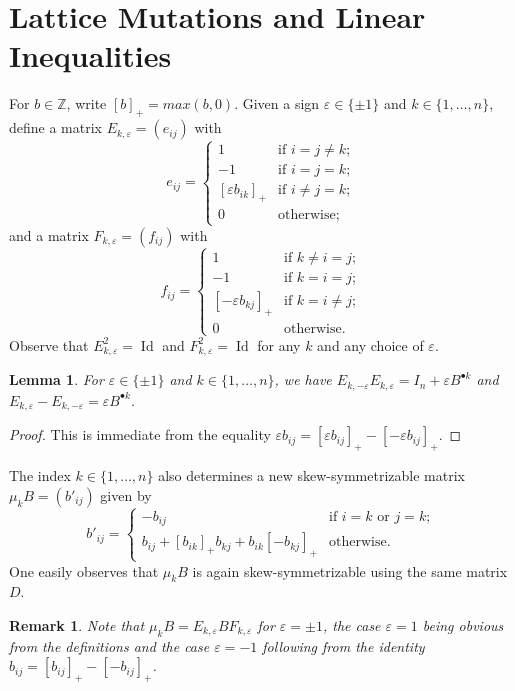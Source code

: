 \documentclass{amsart}
\newtheorem{lemma}[theorem]{Lemma}
\newtheorem{remark}[theorem]{Remark}
\numberwithin{theorem}{section}
\newcommand{\ZZ}{\mathbb{Z}}
\newcommand{\Id}{\operatorname{Id}}
\begin{document}
\section{Lattice Mutations and Linear Inequalities}


  For $b\in\ZZ$, write $[b]_+=max(b,0)$.
  Given a sign $\varepsilon\in\{\pm1\}$ and $k\in\{1,\ldots,n\}$, define a matrix $E_{k,\varepsilon}=(e_{ij})$ with
  \begin{equation}
    \label{eq:left mutation matrix}
    e_{ij}=\begin{cases} 1 & \text{if $i=j\ne k$;}\\ -1 & \text{if $i=j=k$;}\\ [\varepsilon b_{ik}]_+ & \text{if $i\ne j=k$;}\\ 0 & \text{otherwise;} \end{cases}
  \end{equation}
  and a matrix $F_{k,\varepsilon}=(f_{ij})$ with
  \begin{equation}
    \label{eq:right mutation matrix}
    f_{ij}=\begin{cases} 1 & \text{if $k\ne i=j$;}\\ -1 & \text{if $k=i=j$;}\\ [-\varepsilon b_{kj}]_+ & \text{if $k=i\ne j$;}\\ 0 & \text{otherwise.} \end{cases}
  \end{equation}
  Observe that $E^2_{k,\varepsilon}=\Id$ and $F^2_{k,\varepsilon}=\Id$ for any $k$ and any choice of $\varepsilon$.
  \begin{lemma}
    For $\varepsilon\in\{\pm1\}$ and $k\in\{1,\ldots,n\}$, we have $E_{k,-\varepsilon}E_{k,\varepsilon}=I_n+\varepsilon B^{\bullet k}$ and $E_{k,\varepsilon}-E_{k,-\varepsilon}=\varepsilon B^{\bullet k}$.
  \end{lemma}
  \begin{proof}
    This is immediate from the equality $\varepsilon b_{ij}=[\varepsilon b_{ij}]_+-[-\varepsilon b_{ij}]_+$.
  \end{proof}

  The index $k\in\{1,\ldots,n\}$ also determines a new skew-symmetrizable matrix $\mu_k B=(b'_{ij})$ given by
  \[ b'_{ij}=\begin{cases} -b_{ij} & \text{if $i=k$ or $j=k$;}\\ b_{ij}+[b_{ik}]_+b_{kj}+b_{ik}[-b_{kj}]_+ & \text{otherwise.} \end{cases} \]
  One easily observes that $\mu_k B$ is again skew-symmetrizable using the same matrix $D$.
  \begin{remark}
    Note that $\mu_k B=E_{k,\varepsilon} B F_{k,\varepsilon}$ for $\varepsilon=\pm 1$, the case $\varepsilon=1$ being obvious from the definitions and the case $\varepsilon=-1$ following from the identity $b_{ij}=[b_{ij}]_+-[-b_{ij}]_+$.
  \end{remark}
\end{document}
